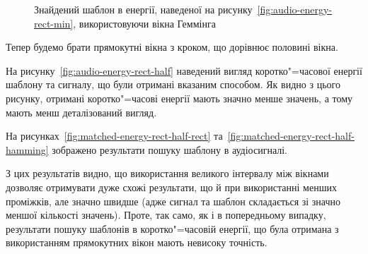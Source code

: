 \begin{figure}[h]

            \caption{Знайдений шаблон в енергії, наведеної на рисунку~\ref{fig:audio-energy-rect-min},
                використовуючи вікна Геммінга}
            \label{fig:matched-energy-rect-min-hamming}
        \end{figure}

        \clearpage

        Тепер будемо брати прямокутні вікна з кроком, що дорівнює половині вікна.

        На рисунку~\ref{fig:audio-energy-rect-half} наведений вигляд коротко"=часової енергії шаблону та сигналу, що
        були отримані вказаним способом.
        Як видно з цього рисунку, отримані коротко"=часові енергії мають значно менше значень, а тому мають менш
        деталізований вигляд.

        На рисунках~\ref{fig:matched-energy-rect-half-rect} та~\ref{fig:matched-energy-rect-half-hamming} зображено
        результати пошуку шаблону в аудіосигналі.

        З цих результатів видно, що використання великого інтервалу між вікнами дозволяє отримувати дуже схожі
        результати, що й при використанні менших проміжків, але значно швидше (адже сигнал та шаблон складається зі
        значно меншої кількості значень).
        Проте, так само, як і в попередньому випадку, результати пошуку шаблонів в коротко"=часовій енергії, що була
        отримана з використанням прямокутних вікон мають невисоку точність.

